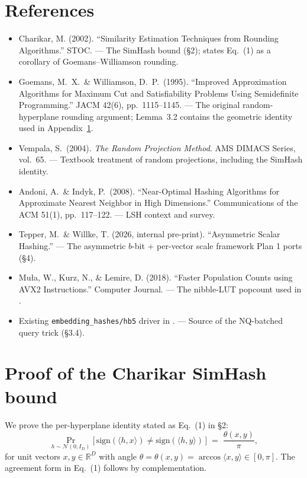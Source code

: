 \documentclass[11pt,a4paper]{article}
\begin{document}
\section*{References}

\begin{itemize}[leftmargin=*]
    \item Charikar, M. (2002). ``Similarity Estimation Techniques from
    Rounding Algorithms.'' STOC. --- The SimHash bound (\S2); states
    Eq.~(1) as a corollary of Goemans--Williamson rounding.
    \item Goemans, M.\ X.\ \& Williamson, D.\ P.\ (1995). ``Improved
    Approximation Algorithms for Maximum Cut and Satisfiability
    Problems Using Semidefinite Programming.'' JACM 42(6),
    pp.~1115--1145. --- The original random-hyperplane rounding
    argument; Lemma~3.2 contains the geometric identity used in
    Appendix~\ref{app:simhash-proof}.
    \item Vempala, S.\ (2004). \emph{The Random Projection Method}.
    AMS DIMACS Series, vol.~65. --- Textbook treatment of random
    projections, including the SimHash identity.
    \item Andoni, A.\ \& Indyk, P.\ (2008). ``Near-Optimal Hashing
    Algorithms for Approximate Nearest Neighbor in High Dimensions.''
    Communications of the ACM 51(1), pp.~117--122. --- LSH context
    and survey.
    \item Tepper, M.\ \& Willke, T. (2026, internal pre-print).
    ``Asymmetric Scalar Hashing.'' --- The asymmetric $b$-bit +
    per-vector scale framework Plan 1 ports (\S4).
    \item Mu\l{}a, W., Kurz, N., \& Lemire, D. (2018). ``Faster
    Population Counts using AVX2 Instructions.'' Computer Journal. ---
    The nibble-LUT popcount used in
    .
    \item Existing \texttt{embedding\_hashes/hb5} driver in
    . --- Source of the NQ-batched query trick
    (\S3.4).
\end{itemize}

\appendix

\section{Proof of the Charikar SimHash bound}\label{app:simhash-proof}

We prove the per-hyperplane identity stated as Eq.~(1) in \S2:
\begin{equation}\label{eq:simhash-restate}
\Pr_{h \sim \mathcal{N}(0, I_D)}\bigl[\,\mathrm{sign}(\langle h, x\rangle) \neq \mathrm{sign}(\langle h, y\rangle)\,\bigr]
\;=\; \frac{\theta(x, y)}{\pi},
\end{equation}
for unit vectors $x, y \in \mathbb{R}^D$ with angle $\theta = \theta(x, y) = \arccos\langle x, y\rangle \in [0, \pi]$. The agreement form in Eq.~(1) follows by complementation.
\end{document}
